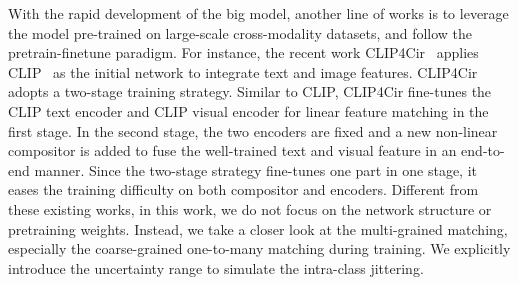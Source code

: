 \documentclass[10pt,twocolumn,letterpaper]{article}
\begin{document}
With the rapid development of the big model, another line of works is to leverage the model pre-trained on large-scale cross-modality datasets, and follow the pretrain-finetune paradigm. 
For instance, the recent work CLIP4Cir~\cite{CLIP4Cir} applies CLIP~\cite{clip} as the initial network to integrate text and image features. CLIP4Cir adopts a two-stage training strategy. Similar to CLIP, CLIP4Cir fine-tunes the CLIP text encoder and CLIP visual encoder for linear feature matching in the first stage. 
In the second stage, the two encoders are fixed and a new non-linear compositor is added to fuse the well-trained text and visual feature in an end-to-end manner. Since the two-stage strategy fine-tunes one part in one stage, it eases the training difficulty on both compositor and encoders.  Different from these existing works, in this work, we do not focus on the network structure or pretraining weights. Instead, we take a closer look at the multi-grained matching, especially the coarse-grained one-to-many matching during training. We explicitly introduce the uncertainty range to simulate the intra-class jittering.
\end{document}
